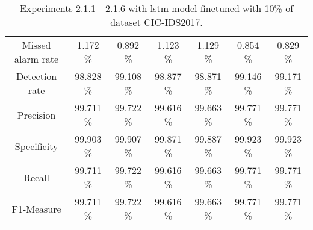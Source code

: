 \begin{table}[htb]
\begin{tabular}{@{}ccccccc@{}}
        Missed alarm rate &  1.172 \% &  0.892 \% &  1.123 \% &  1.129 \% &  0.854 \% &  0.829 \% \\
        Detection rate &  98.828 \% &  99.108 \% &  98.877 \% &  98.871 \% &  99.146 \% &  99.171 \% \\
        Precision &  99.711 \% &  99.722 \% &  99.616 \% &  99.663 \% &  99.771 \% &  99.771 \% \\
        Specificity &  99.903 \% &  99.907 \% &  99.871 \% &  99.887 \% &  99.923 \% &  99.923 \% \\
        Recall &  99.711 \% &  99.722 \% &  99.616 \% &  99.663 \% &  99.771 \% &  99.771 \% \\
        F1-Measure &  99.711 \% &  99.722 \% &  99.616 \% &  99.663 \% &  99.771 \% &  99.771 \% \\
        \bottomrule
    \end{tabular}
    \caption{Experiments 2.1.1 - 2.1.6 with \gls{lstm} model finetuned with 10\% of dataset CIC-IDS2017.}
    \label{table:results:lstm:flows_10}
\end{table}